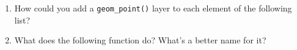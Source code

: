 \begin{enumerate}
\def\labelenumi{\arabic{enumi}.}
\item
  How could you add a \texttt{geom\_point()} layer to each element of
  the following list?

\begin{Shaded}
\begin{Highlighting}[]
\StringTok{ }\NormalTok{(}
   
\NormalTok{)}
\end{Highlighting}
\end{Shaded}
\item
  What does the following function do? What's a better name for it?

\begin{Shaded}
\begin{Highlighting}[]
\StringTok{ }
  \NormalTok{(}\DataTypeTok{+}\NormalTok{, } \NormalTok{)}
\NormalTok{\}}

\NormalTok{(}
  \StringTok{ }\NormalTok{(), }
  \NormalTok{(), }
  \NormalTok{(}\NormalTok{), }
  \NormalTok{(}\NormalTok{)}
\NormalTok{)}
\end{Highlighting}
\end{Shaded}
\end{enumerate}
